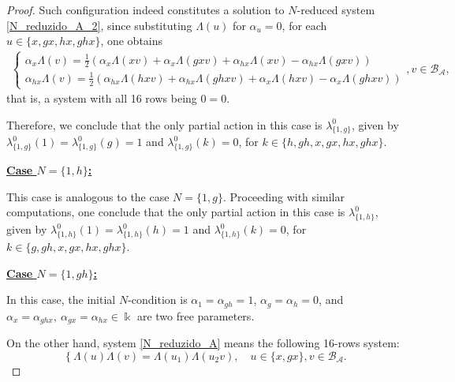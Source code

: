 \documentclass[reqno]{amsart}
\theoremstyle{definition}
\numberwithin{equation}{section}\theoremstyle{plain}
\newcommand{\B}{\mathcal{B}}
\theoremstyle{definition}
\def \A {\mathcal{A}}
\begin{document}
\begin{proof}
\medbreak

Such configuration indeed constitutes a solution to $N$-reduced system \eqref{N_reduzido_A_2}, since substituting $\Lambda(u)$ for $\alpha_u=0$, for each $u \in \{x, gx, hx, ghx\}$, one obtains
\begin{align*}
\left\{
\begin{array}{lll}
\alpha_{x}\Lambda(v)  = \frac{1}{2} \left(\alpha_{x}\Lambda(x v) + \alpha_{x}\Lambda(gx v) + \alpha_{hx}\Lambda(x v) - \alpha_{hx}\Lambda(gx v)\right) \\
\alpha_{hx}\Lambda(v)  = \frac{1}{2} \left(\alpha_{hx}\Lambda(hx v) + \alpha_{hx}\Lambda(ghx v) + \alpha_{x}\Lambda(hx v) - \alpha_{x}\Lambda(ghx v)\right)
\end{array}, 
\right. v \in \B_\A,
\end{align*}
that is, a system with all 16 rows being $0=0$.

Therefore, we conclude that the only partial action in this case is $\lambda_{\{1, g\}}^0$, given by $\lambda_{\{1, g\}}^0(1) = \lambda_{\{1, g\}}^0(g) = 1$ and $\lambda_{\{1, g\}}^0(k)=0$, for $k \in \{h, gh, x, gx, hx, ghx\}.$

\medbreak

\textbf{\underline{Case $N=\{1,h\}$:}}

\smallbreak

This case is analogous to the case $N=\{1, g\}$.
Proceeding with similar computations, one conclude that the only partial action in this case is $\lambda_{\{1, h\}}^0$, given by $\lambda_{\{1, h\}}^0(1) = \lambda_{\{1, h\}}^0(h) = 1$ and $\lambda_{\{1, h\}}^0(k)=0$, for $k \in \{g, gh, x, gx, hx, ghx\}.$

\medbreak

\textbf{\underline{Case $N=\{1,gh\}$:}}

\smallbreak

In this case, the initial $N$-condition is $\alpha_1 = \alpha_{gh} =1$, $\alpha_{g} = \alpha_{h} = 0$, and $\alpha_{x} = \alpha_{ghx}, \ \alpha_{gx} =  \alpha_{hx} \in \Bbbk$ are two free parameters.

On the other hand, system \eqref{N_reduzido_A} means the following 16-rows system:
\begin{equation*}\label{N_reduzido_A_3}
\left\{\Lambda(u)\Lambda(v) = \Lambda(u_1)\Lambda(u_2 v),
\right. \quad u \in \{x, gx\}, v \in \B_\A.
\end{equation*}


\end{proof}
\end{document}
